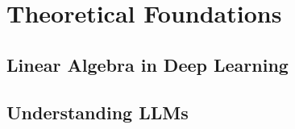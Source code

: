 \chapter{Theoretical Foundations}

\section{Linear Algebra in Deep Learning}

\section{Understanding LLMs}